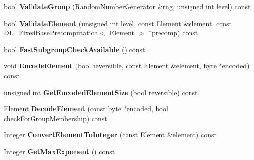 \begin{DoxyCompactItemize}
\item 
\hypertarget{class_d_l___group_parameters___e_c_abb7dceac79c3598ca541eac8ad0f044f}{
bool {\bfseries ValidateGroup} (\hyperlink{class_random_number_generator}{RandomNumberGenerator} \&rng, unsigned int level) const }
\label{class_d_l___group_parameters___e_c_abb7dceac79c3598ca541eac8ad0f044f}

\item 
\hypertarget{class_d_l___group_parameters___e_c_aaff13bcb1b4fa9930914d1c3556fee42}{
bool {\bfseries ValidateElement} (unsigned int level, const Element \&element, const \hyperlink{class_d_l___fixed_base_precomputation}{DL\_\-FixedBasePrecomputation}$<$ Element $>$ $\ast$precomp) const }
\label{class_d_l___group_parameters___e_c_aaff13bcb1b4fa9930914d1c3556fee42}

\item 
\hypertarget{class_d_l___group_parameters___e_c_a31e6ae2e2c2df0ed41359b70f4a6ed93}{
bool {\bfseries FastSubgroupCheckAvailable} () const }
\label{class_d_l___group_parameters___e_c_a31e6ae2e2c2df0ed41359b70f4a6ed93}

\item 
\hypertarget{class_d_l___group_parameters___e_c_a72d99ea33b6163de5cfc649ba8070bd9}{
void {\bfseries EncodeElement} (bool reversible, const Element \&element, byte $\ast$encoded) const }
\label{class_d_l___group_parameters___e_c_a72d99ea33b6163de5cfc649ba8070bd9}

\item 
\hypertarget{class_d_l___group_parameters___e_c_a2e2088c9a44d830835b23cce686067df}{
unsigned int {\bfseries GetEncodedElementSize} (bool reversible) const }
\label{class_d_l___group_parameters___e_c_a2e2088c9a44d830835b23cce686067df}

\item 
\hypertarget{class_d_l___group_parameters___e_c_abb818f7defc3b7067bd30ea8e78ae453}{
Element {\bfseries DecodeElement} (const byte $\ast$encoded, bool checkForGroupMembership) const }
\label{class_d_l___group_parameters___e_c_abb818f7defc3b7067bd30ea8e78ae453}

\item 
\hypertarget{class_d_l___group_parameters___e_c_a16a0e5198ac3057f0f266d9ae7cda621}{
\hyperlink{class_integer}{Integer} {\bfseries ConvertElementToInteger} (const Element \&element) const }
\label{class_d_l___group_parameters___e_c_a16a0e5198ac3057f0f266d9ae7cda621}

\item 
\hypertarget{class_d_l___group_parameters___e_c_a62b2f71f942f0fb673471c079bb0be11}{
\hyperlink{class_integer}{Integer} {\bfseries GetMaxExponent} () const }
\label{class_d_l___group_parameters___e_c_a62b2f71f942f0fb673471c079bb0be11}


\end{DoxyCompactItemize}

